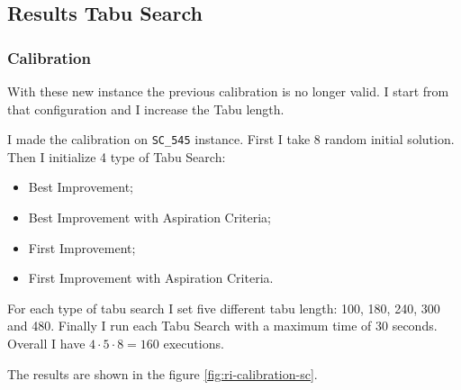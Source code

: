 	
	\newpage
	
	\subsection{Results Tabu Search}
	
		\subsubsection{Calibration}
			With these new instance the previous calibration is no longer valid. I start from that configuration and I increase the Tabu length.
			
			I made the calibration on \verb|SC_545| instance.
			First I take 8 random initial solution. Then I initialize 4 type of Tabu Search:
			\begin{itemize}
				\item Best Improvement;
				\item Best Improvement with Aspiration Criteria;
				\item First Improvement;
				\item First Improvement with Aspiration Criteria.
			\end{itemize}
			For each type of tabu search I set five different tabu length: 100, 180, 240, 300 and 480. Finally I run each Tabu Search with a maximum time of 30 seconds.  Overall I have $4 \cdot 5 \cdot 8 = 160 $ executions. 
			
			The results are shown in the figure \ref{fig:ri-calibration-sc}.
			
